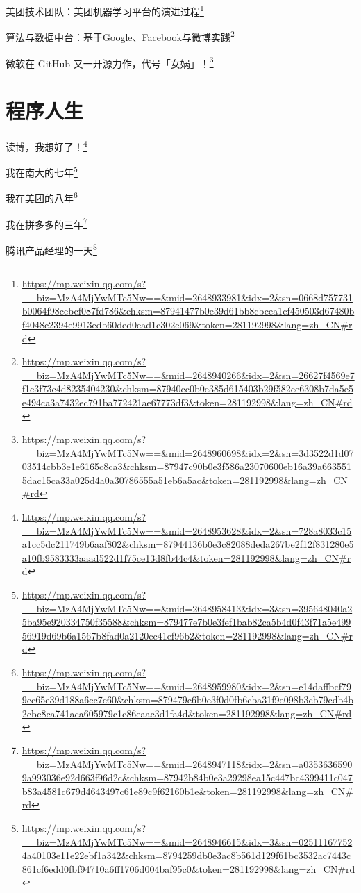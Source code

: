\documentclass[]{ctexbook}
\renewcommand{\href}[2]{#2\footnote{\url{#1}}}
\begin{document}
\href{https://mp.weixin.qq.com/s?__biz=MzA4MjYwMTc5Nw==\&mid=2648933981\&idx=2\&sn=0668d757731b0064f98cebcf087fd786\&chksm=87941477b0e39d61bb8cbcea1cf450503d67480bf4048c2394e9913edb60ded0ead1c302e069\&token=281192998\&lang=zh_CN\#rd}{美团技术团队：美团机器学习平台的演进过程}

\href{https://mp.weixin.qq.com/s?__biz=MzA4MjYwMTc5Nw==\&mid=2648940266\&idx=2\&sn=26627f4569e7f1c3f73c4d8235404230\&chksm=87940cc0b0e385d615403b29f582ce6308b7da5e5e494ca3a7432ec791ba772421ae67773df3\&token=281192998\&lang=zh_CN\#rd}{算法与数据中台：基于Google、Facebook与微博实践}

\href{https://mp.weixin.qq.com/s?__biz=MzA4MjYwMTc5Nw==\&mid=2648960698\&idx=2\&sn=3d3522d1d0703514cbb3e1e6165c8ca3\&chksm=87947c90b0e3f586a23070600eb16a39a6635515dac15ca33a025d4a0a30786555a51eb6a5ac\&token=281192998\&lang=zh_CN\#rd}{微软在 GitHub 又一开源力作，代号「女娲」！}

\hypertarget{ux7a0bux5e8fux4ebaux751f}{%
\section{程序人生}\label{ux7a0bux5e8fux4ebaux751f}}

\href{https://mp.weixin.qq.com/s?__biz=MzA4MjYwMTc5Nw==\&mid=2648953628\&idx=2\&sn=728a8033c15a1cc5dc211749b6aaf802\&chksm=87944136b0e3c82088deda267be2f12f831280e5a10fb9583333aaad522d1f75ce13d8fb44c4\&token=281192998\&lang=zh_CN\#rd}{读博，我想好了！}

\href{https://mp.weixin.qq.com/s?__biz=MzA4MjYwMTc5Nw==\&mid=2648958413\&idx=3\&sn=395648040a25ba95e920334750f35588\&chksm=879477e7b0e3fef1bab82ca5b4d0f43f71a5e49956919d69b6a1567b8fad0a2120cc41ef96b2\&token=281192998\&lang=zh_CN\#rd}{我在南大的七年}

\href{https://mp.weixin.qq.com/s?__biz=MzA4MjYwMTc5Nw==\&mid=2648959980\&idx=2\&sn=e14daffbcf799cc65e39d188a6cc7c60\&chksm=879479c6b0e3f0d0fb6cba31f9e098b3cb79cdb4b2cbc8ca741aca605979c1c86eaac3d1fa4d\&token=281192998\&lang=zh_CN\#rd}{我在美团的八年}

\href{https://mp.weixin.qq.com/s?__biz=MzA4MjYwMTc5Nw==\&mid=2648947118\&idx=2\&sn=a03536365909a993036e92d663f96d2c\&chksm=87942b84b0e3a29298ea15c447bc4399411c047b83a4581c679d4643497c61e89c9f62160b1e\&token=281192998\&lang=zh_CN\#rd}{我在拼多多的三年}

\href{https://mp.weixin.qq.com/s?__biz=MzA4MjYwMTc5Nw==\&mid=2648946615\&idx=3\&sn=025111677524a40103e11e22ebf1a342\&chksm=8794259db0e3ac8b561d129f61bc3532ac7443c861cf6edd0fbf94710a6ff1706d004baf95c0\&token=281192998\&lang=zh_CN\#rd}{腾讯产品经理的一天}
\end{document}
